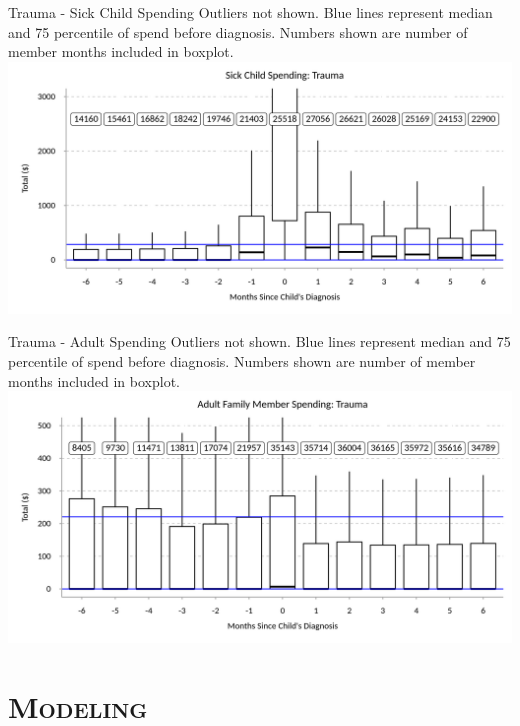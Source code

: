\documentclass[xcolor=x11names,compress]{beamer}
\renewcommand{\(}{\begin{columns}}
\renewcommand{\)}{\end{columns}}
\newcommand{\<}[1]{\begin{column}{#1}}
\renewcommand{\>}{\end{column}}
\begin{document}
\begin{frame}{Trauma - Sick Child Spending}
\small
Outliers not shown. Blue lines represent median and 75 percentile of spend before diagnosis. Numbers
shown are number of member months included in boxplot. 
\includegraphics[width=\linewidth]{../figures/sick_child_spend_Trauma.png}
\end{frame}

\begin{frame}{Trauma - Adult Spending}
\small
Outliers not shown. Blue lines represent median and 75 percentile of spend before diagnosis. Numbers
shown are number of member months included in boxplot. 
\includegraphics[width=\linewidth]{../figures/adult_family_spend_Trauma.png}
\end{frame}

\section{\scshape Modeling}
\end{document}
